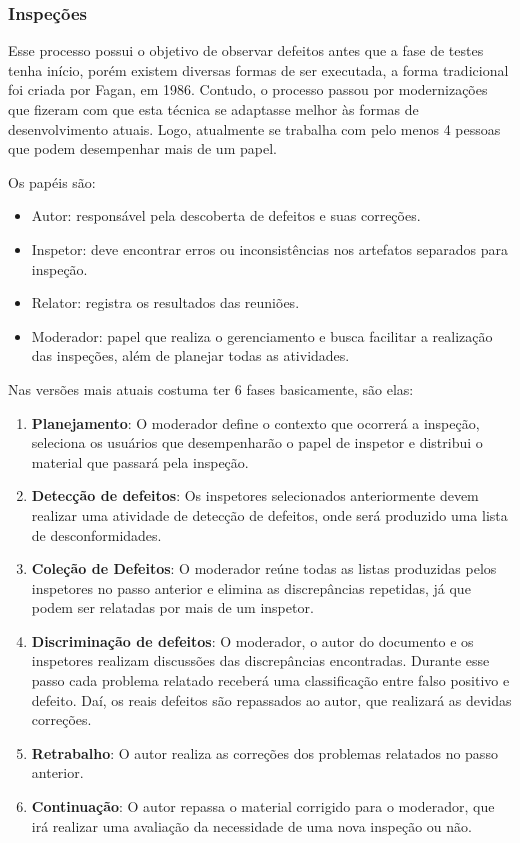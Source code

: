 \documentclass[runningheads]{llncs}
\begin{document}
\subsubsection{Inspeções}
Esse processo possui o objetivo de observar defeitos antes que a fase de testes tenha início, porém existem diversas formas de ser executada, a forma tradicional foi criada por Fagan, em 1986. Contudo, o processo passou por modernizações que fizeram com que esta técnica se adaptasse melhor às formas de desenvolvimento atuais. Logo, atualmente se trabalha com pelo menos 4 pessoas que podem desempenhar mais de um papel.

Os papéis são:
\begin{itemize}
    \item Autor: responsável pela descoberta de defeitos e suas correções.
    \item Inspetor: deve encontrar erros ou inconsistências nos artefatos separados para inspeção.
    \item Relator: registra os resultados das reuniões.
    \item Moderador: papel que realiza o gerenciamento e busca facilitar a realização das inspeções, além de planejar todas as atividades.
\end{itemize}

Nas versões mais atuais costuma ter 6 fases basicamente, são elas:
\begin{enumerate}
    \item \textbf{Planejamento}: O moderador define o contexto que ocorrerá a inspeção, seleciona os usuários que desempenharão o papel de inspetor e distribui o material que passará pela inspeção.
    \item \textbf{Detecção de defeitos}: Os inspetores selecionados anteriormente devem realizar uma atividade de detecção de defeitos, onde será produzido uma lista de desconformidades.
    \item \textbf{Coleção de Defeitos}: O moderador reúne todas as listas produzidas pelos inspetores no passo anterior e elimina as discrepâncias repetidas, já que podem ser relatadas por mais de um inspetor.
    \item \textbf{Discriminação de defeitos}: O moderador, o autor do documento e os inspetores realizam discussões das discrepâncias encontradas. Durante esse passo cada problema relatado receberá uma classificação entre falso positivo e defeito. Daí, os reais defeitos são repassados ao autor, que realizará as devidas correções.
    \item \textbf{Retrabalho}: O autor realiza as correções dos problemas relatados no passo anterior.
    \item \textbf{Continuação}: O autor repassa o material corrigido para o moderador, que irá realizar uma avaliação da necessidade de uma nova inspeção ou não.
\end{enumerate}
\end{document}
